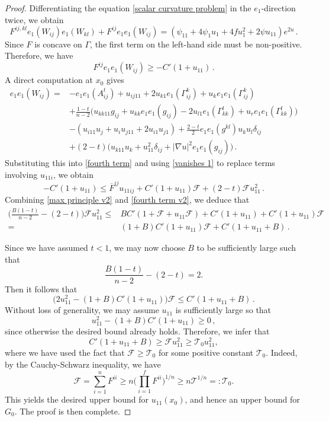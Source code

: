 \documentclass[10pt,a4paper]{amsart}
\begin{document}
\begin{proof}
Differentiating the equation \eqref{scalar curvature problem} in the $e_1$-direction twice, we obtain
\begin{equation*}
F^{ij,kl}e_{1}(W_{ij})e_{1}(W_{kl})+F^{ij}e_{1}e_{1}(W_{ij})=(\psi_{11}+4\psi_{1}u_{1}+4fu_{1}^2+2\psi u_{11})e^{2u}\,.
\end{equation*}
Since $F$ is concave on $\Gamma$, the first term on the left-hand side must be non-positive. Therefore, we have
\begin{equation}\label{fourth term}
F^{ij}e_{1}e_{1}(W_{ij})\geq -C'(1+u_{11})\,.
\end{equation}
A direct computation at $x_0$ gives
\[
\begin{split}
e_{1}e_{1}(W_{ij})=&-e_{1}e_{1}(A^{t}_{ij})+u_{ij11}+2u_{k1}e_{1}(\Gamma_{ij}^{k})+u_{k}e_{1}e_{1}(\Gamma_{ij}^{k})  \\
&+\frac{1-t}{n-2}\big(u_{kk11}g_{ij}+u_{kk}e_{1}e_{1}(g_{ij})-2u_{l1}e_{1}(\Gamma_{kk}^{l})+u_{r}e_{1}e_{1}(\Gamma_{kk}^{l}) \big)\\
&-(u_{i11}u_{j}+u_{i}u_{j11}+2u_{i1}u_{j1})+\frac{2-t}{2}e_{1}e_{1}(g^{kl})u_{k}u_{l}\delta_{ij}\\
&+(2-t)\big(u_{k11}u_{k}+u_{11}^{2}\delta_{ij}+|\nabla u|^2e_{1}e_{1}(g_{ij}) \big)\,.
\end{split}
\]
Substituting this into \eqref{fourth term} and using \eqref{vanishes 1} to replace terms involving $u_{11i}$, we obtain
\begin{equation}\label{fourth term v2}
-C'(1+u_{11})\leq \overline{F}^{ij} u_{11ij}+C'(1+u_{11})\mathcal{F}+(2-t)\mathcal{F}u_{11}^{2}\,.
\end{equation}
Combining \eqref{max principle v2} and \eqref{fourth term v2}, we deduce that
\begin{equation*}
\begin{split}
 \Big(\frac{B(1-t)}{n-2}-(2-t)\Big)\mathcal{F} u_{11}^{2}\leq &BC' (1+\mathcal{F}+u_{11}\mathcal{F} )+C'(1+u_{11})+C'(1+u_{11})\mathcal{F}\\
 =& (1+B)C'(1+u_{11})\mathcal{F}+C'(1+u_{11}+B)\,.
\end{split}
\end{equation*}

Since we have assumed $t<1$,  we may now choose $B$ to be sufficiently large such that
\[
\frac{B(1-t)}{n-2}-(2-t)=2.
\]
Then it follows that
\[
\big(2u_{11}^{2}- (1+B)C'(1+u_{11}) \big)\mathcal{F}\leq C'(1+u_{11}+B)\,.
\]
Without loss of generality, we may assume $u_{11}$ is sufficiently large so that 
\[
u_{11}^{2}- (1+B)C'(1+u_{11})\geq 0\,,
\]
since otherwise the desired bound already holds. Therefore, we infer that
\[
C'(1+u_{11}+B)\geq \mathcal{F}u_{11}^{2}\geq \mathscr{T}_{0}u_{11}^{2},
\]
where we have used the fact that $\mathcal{F} \geq \mathscr{T}_{0}$ for some positive constant $\mathscr{T}_{0}$. Indeed, by the Cauchy-Schwarz inequality, we have
\[
\mathcal{F}=\sum_{i=1}^{n}F^{ii}\geq n\Big(\prod_{i=1}^{f}F^{ii} \Big)^{1/n}\geq n\mathscr{T}^{1/n}=:\mathscr{T}_{0}.
\]
This yields the desired upper bound for $u_{11}(x_0)$, and hence an upper bound for $G_0$. The proof is then complete.
\end{proof}
\end{document}
